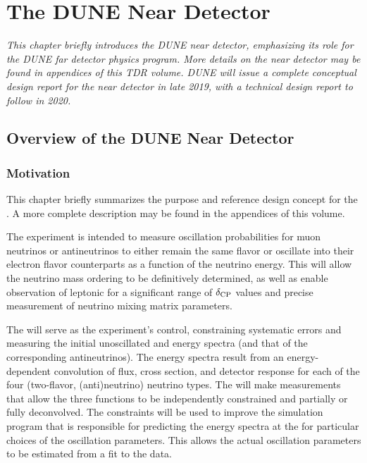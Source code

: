 \chapter{The DUNE Near Detector} %
\label{ch:exsum-nd}

\textit{This chapter briefly introduces the DUNE near detector, emphasizing its role for the DUNE far detector physics program.  More details on the near detector may be found in  appendices of this TDR volume.  DUNE will issue a complete conceptual design report for the near detector in late 2019, with a technical design report to follow in 2020.}

\section{Overview of the DUNE Near Detector}
\label{sec:exsum-nd-overview}


\subsection{Motivation}
\label{sec:exsum-nd-BriefOverview-need}

This chapter briefly summarizes the purpose and reference design concept for the  .  A more complete description may be found in the appendices of this volume.

The  experiment is intended to measure oscillation probabilities for muon neutrinos or antineutrinos to either remain the same flavor or oscillate into their electron flavor counterparts as a function of the neutrino energy. This will allow the neutrino mass ordering to be definitively determined, as well as enable observation of leptonic  for a significant range of $\delta_{\rm{CP}}$ values and precise measurement of %
neutrino mixing matrix parameters.

The  will serve as the experiment's control,
 constraining systematic errors and measuring the initial unoscillated \numu and \nue energy spectra (and that of the corresponding antineutrinos). %
 The energy spectra result from an energy-dependent convolution of flux, cross section, and detector response for each of the four (two-flavor, (anti)neutrino) neutrino types.
  The  will make measurements that allow the three functions to be independently constrained and partially or fully deconvolved. The constraints will be used to improve the simulation program that is responsible for predicting the energy spectra at the  for particular choices of the oscillation parameters. This allows the actual oscillation parameters to be estimated from a fit to the  data. 
 
